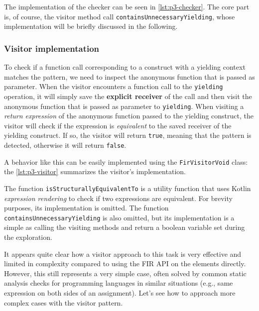 \documentclass[12pt,a4paper,openright,twoside]{book}
\begin{document}
The implementation of the checker can be seen in \cref{lst:p3-checker}. The core
part is, of course, the visitor method call
\lstinline{containsUnnecessaryYielding}, whose implementation will be briefly
discussed in the following.



\subsubsection{Visitor implementation}

To check if a function call corresponding to a construct with a yielding context
matches the pattern, we need to inspect the anonymous function that is passed as
parameter. When the visitor encounters a function call to the
\lstinline{yielding} operation, it will simply save the \textbf{explicit
receiver} of the call and then visit the anonymous function that is passed as
parameter to \lstinline{yielding}.
%
When visiting a \emph{return expression} of the anonymous function
passed to the yielding construct, the visitor will check if the expression is
\emph{equivalent} to the saved receiver of the yielding construct.
%
If so, the visitor will return \lstinline{true}, meaning that the pattern is
detected, otherwise it will return \lstinline{false}. 

A behavior like this can be easily implemented using the
\lstinline{FirVisitorVoid} class: the \cref{lst:p3-visitor} summarizes the visitor's
implementation.



The function \lstinline{isStructurallyEquivalentTo} is a utility function that
uses Kotlin \emph{expression rendering} to check if two expressions are 
equivalent. For brevity purposes, its implementation is omitted.
%
The function \lstinline{containsUnnecessaryYielding} is also omitted, but its
implementation is a simple as calling the visiting methods and return a boolean
variable set during the exploration.

It appears quite clear how a visitor approach to this task is very effective and
limited in complexity compared to using the \ac{FIR} API on the elements
directly. However, this still represents a very simple case, often solved by
common static analysis checks for programming languages in similar situations
(e.g., same expression on both sides of an assignment). Let's see how to 
approach more complex cases with the visitor pattern.
\end{document}

